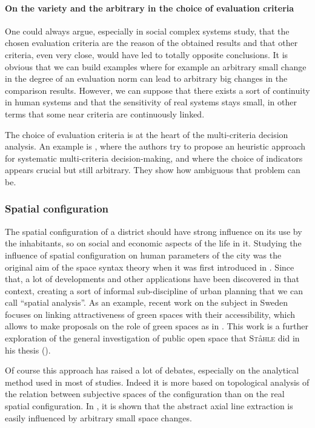\documentclass[english]{article}
\newcommand{\noun}[1]{\textsc{#1}}
\begin{document}
\paragraph{On the variety and the arbitrary in the choice of evaluation criteria}

One could always argue, especially in social complex systems study,
that the chosen evaluation criteria are the reason of the obtained
results and that other criteria, even very close, would have led
to totally opposite conclusions. It is obvious that we can build examples
where for example an arbitrary small change in the degree of an evaluation
norm can lead to arbitrary big changes in the comparison results. 
However, we can suppose that there exists a sort of continuity in
human systems and that the sensitivity of real systems stays small,
in other terms that some near criteria are continuously linked.

\bigskip{}


The choice of evaluation criteria is at the heart of the multi-criteria
decision analysis. An example is \cite{zietsman2006transportation},
where the authors try to propose an heuristic approach for systematic multi-criteria
decision-making, and where the choice of indicators appears crucial
but still arbitrary. They show how ambiguous that problem can be.


\subsubsection{Spatial configuration}

The spatial configuration of a district should have strong influence
on its use by the inhabitants, so on social and economic aspects of
the life in it. Studying the influence of spatial configuration on
human parameters of the city was the original aim of the space syntax
theory when it was first introduced in \cite{hillier1976space}. Since
that, a lot of developments and other applications have been discovered
in that context, creating a sort of informal sub-discipline of urban
planning that we can call ``spatial analysis''. As an example, recent
work on the subject in Sweden focuses on linking attractiveness
of green spaces with their accessibility, which allows to make proposals
on the role of green spaces as in \cite{staahle2010more}. This work
is a further exploration of the general investigation of public open
space that \noun{St}{\aa}\noun{hle} did in his thesis (\cite{staahle2008compact}).\bigskip{}


Of course this approach has raised a lot of debates, especially
on the analytical method used in most of studies. Indeed it is more based
on topological analysis of the relation between subjective spaces
of the configuration than on the real spatial configuration. In \cite{ratti2004urban},
it is shown that the abstract axial line extraction is easily influenced
by arbitrary small space changes.
\end{document}
